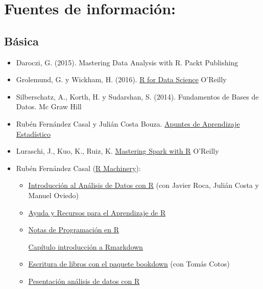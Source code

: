 \documentclass[
]{book}
\theoremstyle{break}
\theoremstyle{nonumberplain}
\begin{document}
\section{Fuentes de información:}\label{fuentes-de-informaciuxf3n}

\subsection{Básica}\label{buxe1sica}

\begin{itemize}
\item
  Daroczi, G. (2015). Mastering Data Analysis with R. Packt Publishing
\item
  Grolemund, G. y Wickham, H. (2016). \href{https://r4ds.had.co.nz/}{R for Data Science} O'Reilly
\item
  Silberschatz, A., Korth, H. y Sudarshan, S. (2014). Fundamentos de Bases de Datos. Mc Graw Hill
\item
  Rubén Fernández Casal y Julián Costa Bouza. \href{https://rubenfcasal.github.io/aprendizaje_estadistico/}{Apuntes de Aprendizaje Estadístico}
\item
  Luraschi, J., Kuo, K., Ruiz, K. \href{https://therinspark.com/}{Mastering Spark with R} O'Reilly
\item
  Rubén Fernández Casal (\href{https://rubenfcasal.github.io}{R Machinery}):

  \begin{itemize}
  \item
    \href{https://rubenfcasal.github.io/intror}{Introducción al Análisis de Datos con R}
    (con Javier Roca, Julián Costa y Manuel Oviedo)
  \item
    \href{https://rubenfcasal.github.io/post/ayuda-y-recursos-para-el-aprendizaje-de-r}{Ayuda y Recursos para el Aprendizaje de R}
  \item
    \href{https://rubenfcasal.github.io/book_notasr}{Notas de Programación en R}

    \href{https://rubenfcasal.github.io/bookdown_intro/rmarkdown.html}{Capítulo introducción a Rmarkdown}
  \item
    \href{https://rubenfcasal.github.io/bookdown_intro}{Escritura de libros con el paquete bookdown}
    (con Tomás Cotos)
  \item
    \href{https://rubenfcasal.github.io/post/presentaciones/AnalisisDatosR.pdf}{Pesentación análisis de datos con R}
  \end{itemize}
\end{itemize}
\end{document}
